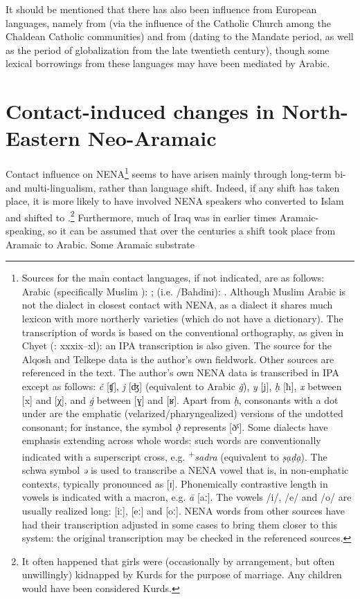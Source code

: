 \documentclass[output=paper]{langsci/langscibook}
\begin{document}
It should be mentioned that there has also been influence from European languages, namely from  (via the influence of the Catholic Church among the Chaldean Catholic communities) and from  (dating to the  Mandate period, as well as the period of globalization from the late twentieth century), though some lexical borrowings from these languages may have been mediated by Arabic.


\section{Contact-induced changes in North-Eastern Neo-Aramaic}

Contact influence on NENA\footnote{Sources for the main contact languages, if not indicated, are as follows:  Arabic (specifically Muslim ): \citet{WoodheadEtAl1967};  (i.e. /Bahdini): \citet{Chyet2003}. Although Muslim  Arabic is not the dialect in closest contact with NENA, as a  dialect it shares much lexicon with more northerly varieties (which do not have a dictionary). The transcription of  words is based on the conventional {orthography}, as given in Chyet (\citeyear{Chyet2003}: xxxix–xl): an IPA transcription is also given. The source for the  Alqosh and  Telkepe data is the author’s own fieldwork. Other sources are referenced in the text. The author’s own NENA data is transcribed in IPA except as follows: \textit{č} [ʧ], \textit{j} [ʤ] (equivalent to Arabic \textit{ǧ}), \textit{y} [j], \textit{ḥ} [ħ], \textit{x} between [x] and [χ], and \textit{\.g} between [ɣ] and [ʁ]. Apart from \textit{ḥ}, consonants with a dot under are the {emphatic} (velarized/{pharyngealized}) versions of the undotted consonant; for instance, the symbol \textit{ð̣} represents [ðˤ]. Some dialects have {emphasis} extending across whole words: such words are conventionally indicated with a superscript cross, e.g. \textrm{\textsuperscript{+}}\textrm{\textit{sadra} }\textrm{(equivalent to} \textrm{\textit{ṣạḍ{\R}ạ}}). The schwa symbol \textit{ə} is used to transcribe a NENA vowel that is, in non-{emphatic} contexts, typically pronounced as [ɪ]. Phonemically contrastive length in vowels is indicated with a macron, e.g. \textit{ā} [aː]. The vowels /i/, /e/ and /o/ are usually realized long: [iː], [eː] and [oː]. NENA words from other sources have had their transcription adjusted in some cases to bring them closer to this system: the original transcription may be checked in the referenced sources.} seems to have arisen mainly through long-term bi- and multi-lingualism, rather than {language shift}. Indeed, if any shift has taken place, it is more likely to have involved NENA speakers who converted to Islam and shifted to .\footnote{It often happened that  girls were (occasionally by arrangement, but often unwillingly) kidnapped by {Kurds} for the purpose of marriage. Any children would have been considered {Kurds}.} Furthermore, much of Iraq was in earlier times Aramaic-speaking, so it can be assumed that over the centuries a shift took place from Aramaic to Arabic. Some Aramaic {substrate} 
\end{document}
